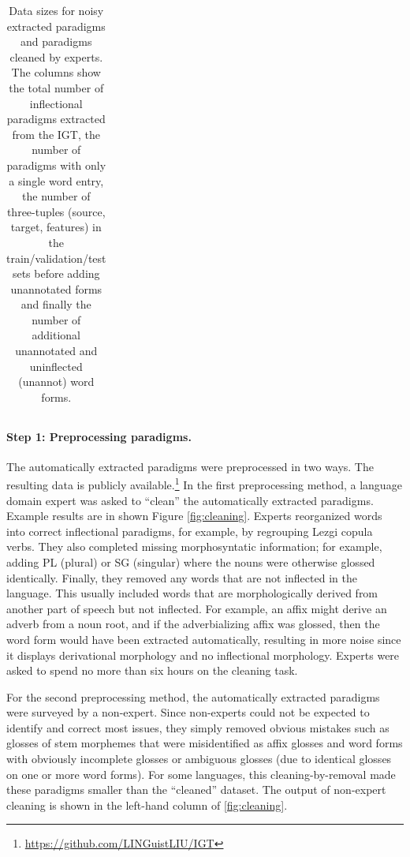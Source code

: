 \begin{table}[!tb]
\begin{tabular}{l|ccccccc}
    \end{tabular}
    \caption[IGT2P data]{Data sizes for noisy extracted paradigms and paradigms cleaned by experts. The columns show the total number of inflectional paradigms extracted from the IGT, the number of paradigms with only a single word entry, the number of three-tuples (source, target, features) in the train/validation/test sets before adding unannotated forms and finally the number of additional unannotated and uninflected (unannot) word forms.}
    \label{tab:IGT2Pdata}
\end{table}


\paragraph{Step 1: Preprocessing paradigms.}
The automatically extracted paradigms were preprocessed in two ways. The resulting data is publicly available.\footnote{\url{https://github.com/LINGuistLIU/IGT}}
In the first preprocessing method, a language domain expert was asked to ``clean'' the automatically extracted paradigms. Example results are in shown Figure \ref{fig:cleaning}. Experts reorganized words into correct inflectional paradigms, for example, by regrouping Lezgi copula verbs. They also completed missing morphosyntatic information; for example, adding PL (plural) or SG (singular) where the nouns were otherwise glossed identically. Finally, they removed any words that are not inflected in the language. This usually included words that are morphologically derived from another part of speech but not inflected. For example, an affix might derive an adverb from a noun root, and if the adverbializing affix was glossed, then the word form would have been extracted automatically, resulting in more noise since it displays derivational morphology and no inflectional morphology. Experts were asked to spend no more than six hours on the cleaning task. 

For the second preprocessing method, the automatically extracted paradigms were surveyed by a non-expert. Since non-experts could not be expected to identify and correct most issues, they simply removed obvious mistakes such as glosses of stem morphemes that were misidentified as affix glosses and word forms with obviously incomplete glosses or ambiguous glosses (due to identical glosses on one or more word forms). For some languages, this cleaning-by-removal made these paradigms smaller than the ``cleaned'' dataset. The output of non-expert cleaning is shown in the left-hand column of \autoref{fig:cleaning}.

